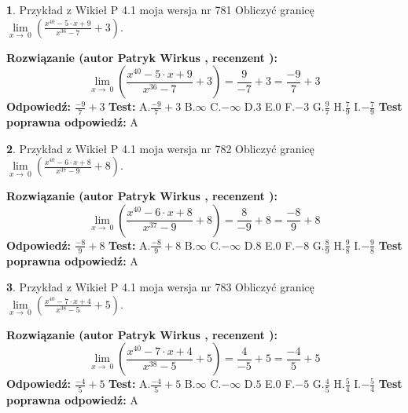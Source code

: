 \documentclass[12pt, a4paper]{article}
\theoremstyle{definition} %
\newtheorem{zad}{}
\newcommand{\zadStart}[1]{\begin{zad}#1\newline}
\newcommand{\zadStop}{\end{zad}}
\newcommand{\rozwStart}[2]{\noindent \textbf{Rozwiązanie (autor #1 , recenzent #2): }\newline}
\newcommand{\rozwStop}{\newline}
\newcommand{\odpStart}{\noindent \textbf{Odpowiedź:}\newline}
\newcommand{\odpStop}{\newline}
\newcommand{\testStart}{\noindent \textbf{Test:}\newline}
\newcommand{\testStop}{\newline}
\newcommand{\kluczStart}{\noindent \textbf{Test poprawna odpowiedź:}\newline}
\newcommand{\kluczStop}{\newline}
\begin{document}
\zadStart{Przykład z Wikieł P 4.1 moja wersja nr 781}
Obliczyć granicę $\lim\limits_{x\to\ 0}(\frac{x^{40}-5 \cdot x +9}{x^{36}-7}+3)$.
\zadStop
\rozwStart{Patryk Wirkus}{}
$$\lim\limits_{x\to\ 0}(\frac{x^{40}-5 \cdot x +9}{x^{36}-7}+3)=\frac{9}{-7}+3=\frac{-9}{7}+3$$
\rozwStop
\odpStart
$\frac{-9}{7}+3$
\odpStop
\testStart
A.$\frac{-9}{7}+3$
B.$\infty$
C.$-\infty$
D.$3$
E.$0$
F.$-3$
G.$\frac{9}{7}$
H.$\frac{7}{9}$
I.$-\frac{7}{9}$
\testStop
\kluczStart
A
\kluczStop



\zadStart{Przykład z Wikieł P 4.1 moja wersja nr 782}
Obliczyć granicę $\lim\limits_{x\to\ 0}(\frac{x^{40}-6 \cdot x +8}{x^{37}-9}+8)$.
\zadStop
\rozwStart{Patryk Wirkus}{}
$$\lim\limits_{x\to\ 0}(\frac{x^{40}-6 \cdot x +8}{x^{37}-9}+8)=\frac{8}{-9}+8=\frac{-8}{9}+8$$
\rozwStop
\odpStart
$\frac{-8}{9}+8$
\odpStop
\testStart
A.$\frac{-8}{9}+8$
B.$\infty$
C.$-\infty$
D.$8$
E.$0$
F.$-8$
G.$\frac{8}{9}$
H.$\frac{9}{8}$
I.$-\frac{9}{8}$
\testStop
\kluczStart
A
\kluczStop



\zadStart{Przykład z Wikieł P 4.1 moja wersja nr 783}
Obliczyć granicę $\lim\limits_{x\to\ 0}(\frac{x^{40}-7 \cdot x +4}{x^{38}-5}+5)$.
\zadStop
\rozwStart{Patryk Wirkus}{}
$$\lim\limits_{x\to\ 0}(\frac{x^{40}-7 \cdot x +4}{x^{38}-5}+5)=\frac{4}{-5}+5=\frac{-4}{5}+5$$
\rozwStop
\odpStart
$\frac{-4}{5}+5$
\odpStop
\testStart
A.$\frac{-4}{5}+5$
B.$\infty$
C.$-\infty$
D.$5$
E.$0$
F.$-5$
G.$\frac{4}{5}$
H.$\frac{5}{4}$
I.$-\frac{5}{4}$
\testStop
\kluczStart
A
\kluczStop
\end{document}
